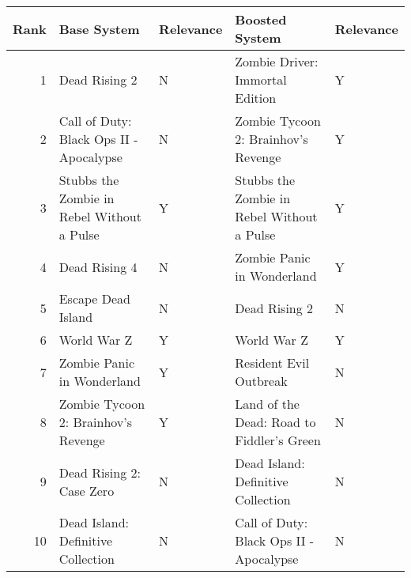 \begin{tabular}{rllll}
\toprule
Rank & Base System & Relevance & Boosted System & Relevance \\
\midrule
1 & Dead Rising 2 & N & Zombie Driver: Immortal Edition & Y \\
2 & Call of Duty: Black Ops II - Apocalypse & N & Zombie Tycoon 2: Brainhov's Revenge & Y \\
3 & Stubbs the Zombie in Rebel Without a Pulse & Y & Stubbs the Zombie in Rebel Without a Pulse & Y \\
4 & Dead Rising 4 & N & Zombie Panic in Wonderland & Y \\
5 & Escape Dead Island & N & Dead Rising 2 & N \\
6 & World War Z & Y & World War Z & Y \\
7 & Zombie Panic in Wonderland & Y & Resident Evil Outbreak & N \\
8 & Zombie Tycoon 2: Brainhov's Revenge & Y & Land of the Dead: Road to Fiddler's Green & N \\
9 & Dead Rising 2: Case Zero & N & Dead Island: Definitive Collection & N \\
10 & Dead Island: Definitive Collection & N & Call of Duty: Black Ops II - Apocalypse & N \\
\bottomrule
\end{tabular}
